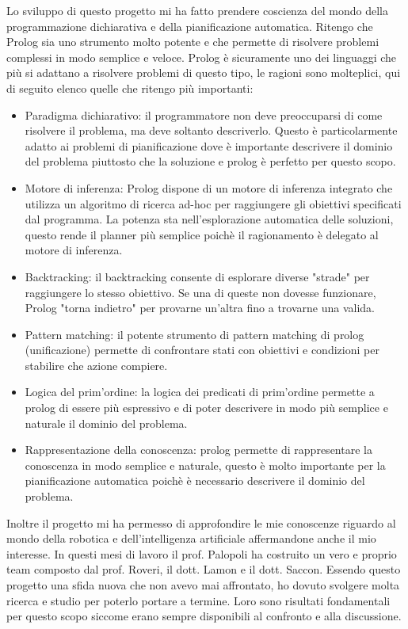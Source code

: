 Lo sviluppo di questo progetto mi ha fatto prendere coscienza del mondo della programmazione dichiarativa e della pianificazione automatica. 
Ritengo che Prolog sia uno strumento molto potente e che permette di risolvere problemi complessi in modo semplice e veloce.
Prolog è sicuramente uno dei linguaggi che più si adattano a risolvere problemi di questo tipo, le ragioni sono molteplici, qui di seguito elenco quelle che ritengo più importanti:
\begin{itemize}
    \item Paradigma dichiarativo: il programmatore non deve preoccuparsi di come risolvere il problema, ma deve soltanto descriverlo. 
          Questo è particolarmente adatto ai problemi di pianificazione dove è importante descrivere il dominio del problema piuttosto che la soluzione e prolog è perfetto per questo scopo.
    \item Motore di inferenza: Prolog dispone di un motore di inferenza integrato che utilizza un algoritmo di ricerca ad-hoc per raggiungere gli obiettivi specificati dal programma. 
          La potenza sta nell'esplorazione automatica delle soluzioni, questo rende il planner più semplice poichè il ragionamento è delegato al motore di inferenza.
    \item Backtracking: il backtracking consente di esplorare diverse "strade" per raggiungere lo stesso obiettivo. Se una di queste non dovesse funzionare, Prolog "torna indietro" per provarne un'altra fino a trovarne una valida.
    \item Pattern matching: il potente strumento di pattern matching di prolog (unificazione) permette di confrontare stati con obiettivi e condizioni per stabilire che azione compiere.
    \item Logica del prim'ordine: la logica dei predicati di prim'ordine permette a prolog di essere più espressivo e di poter descrivere in modo più semplice e naturale il dominio del problema.
    \item Rappresentazione della conoscenza: prolog permette di rappresentare la conoscenza in modo semplice e naturale, questo è molto importante per la pianificazione automatica poichè è necessario descrivere il dominio del problema.
\end{itemize} 

Inoltre il progetto mi ha permesso di approfondire le mie conoscenze riguardo al mondo della robotica e dell'intelligenza artificiale affermandone anche il mio interesse. In questi mesi di lavoro il prof. Palopoli ha costruito un vero e proprio team composto dal prof. Roveri, il dott. Lamon e il dott. Saccon.
Essendo questo progetto una sfida nuova che non avevo mai affrontato, ho dovuto svolgere molta ricerca e studio per poterlo portare a termine. Loro sono risultati fondamentali per questo scopo siccome erano sempre disponibili al confronto e alla discussione.

